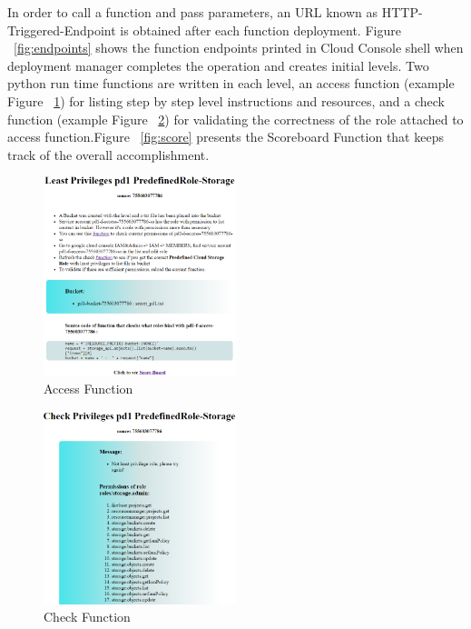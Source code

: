 \documentclass[sigconf]{acmart}
\begin{document}
In order to call a function and pass parameters, an URL known as HTTP-Triggered-Endpoint is obtained after each function deployment. Figure ~\ref{fig:endpoints} shows the function endpoints printed in Cloud Console shell when deployment manager completes the operation and creates initial levels.
Two python run time functions are written in each level, an access function (example Figure ~\ref{fig:access}) for listing step by step level instructions and resources, and a check function (example Figure ~\ref{fig:check}) for validating the correctness of the role attached to access function.Figure  ~\ref{fig:score} presents the Scoreboard Function that keeps track of the overall accomplishment.  
\begin{figure}[h]
  \centering
  \includegraphics[width=0.5\textwidth]{access}
  \caption {Access Function}
  \label{fig:access}
\end{figure}
\begin{figure}[h]
  \centering
  \includegraphics[width=0.5\textwidth]{check}
  \caption {Check Function}
  \label{fig:check}
\end{figure}
\end{document}
